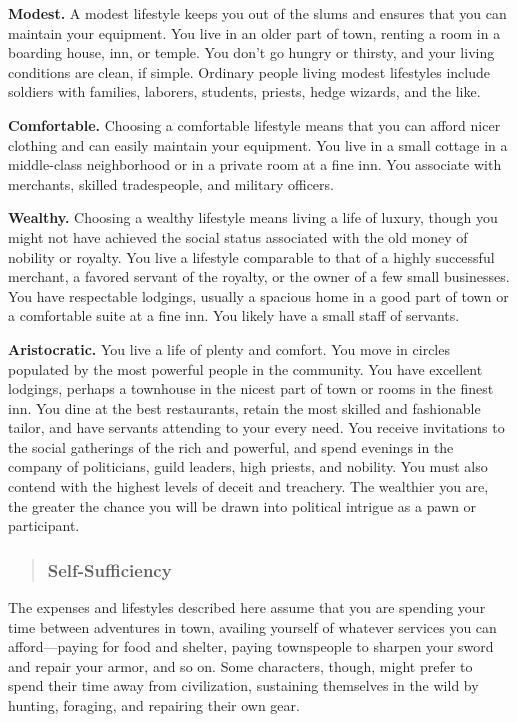 \documentclass[
]{article}
\begin{document}
\textbf{Modest.} A modest lifestyle keeps you out of the slums and
ensures that you can maintain your equipment. You live in an older part
of town, renting a room in a boarding house, inn, or temple. You don't
go hungry or thirsty, and your living conditions are clean, if simple.
Ordinary people living modest lifestyles include soldiers with families,
laborers, students, priests, hedge wizards, and the like.

\textbf{Comfortable.} Choosing a comfortable lifestyle means that you
can afford nicer clothing and can easily maintain your equipment. You
live in a small cottage in a middle-class neighborhood or in a private
room at a fine inn. You associate with merchants, skilled tradespeople,
and military officers.

\textbf{Wealthy.} Choosing a wealthy lifestyle means living a life of
luxury, though you might not have achieved the social status associated
with the old money of nobility or royalty. You live a lifestyle
comparable to that of a highly successful merchant, a favored servant of
the royalty, or the owner of a few small businesses. You have
respectable lodgings, usually a spacious home in a good part of town or
a comfortable suite at a fine inn. You likely have a small staff of
servants.

\textbf{Aristocratic.} You live a life of plenty and comfort. You move
in circles populated by the most powerful people in the community. You
have excellent lodgings, perhaps a townhouse in the nicest part of town
or rooms in the finest inn. You dine at the best restaurants, retain the
most skilled and fashionable tailor, and have servants attending to your
every need. You receive invitations to the social gatherings of the rich
and powerful, and spend evenings in the company of politicians, guild
leaders, high priests, and nobility. You must also contend with the
highest levels of deceit and treachery. The wealthier you are, the
greater the chance you will be drawn into political intrigue as a pawn
or participant.

\begin{quote}
\hypertarget{self-sufficiency}{%
\subsubsection{Self-Sufficiency}\label{self-sufficiency}}
\end{quote}

The expenses and lifestyles described here assume that you are spending
your time between adventures in town, availing yourself of whatever
services you can afford---paying for food and shelter, paying
townspeople to sharpen your sword and repair your armor, and so on. Some
characters, though, might prefer to spend their time away from
civilization, sustaining themselves in the wild by hunting, foraging,
and repairing their own gear.
\end{document}
